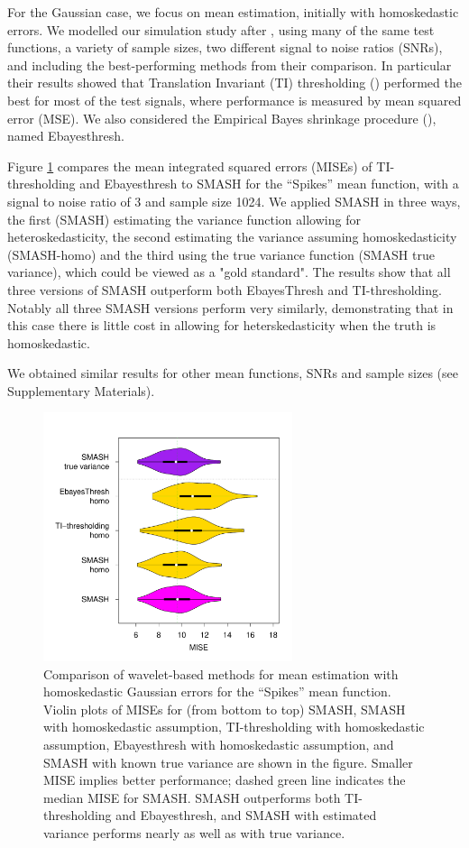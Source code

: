 \documentclass[12pt]{article}
\begin{document}
For the Gaussian case, we focus on mean estimation, initially with homoskedastic errors. We modelled our simulation study after
\cite{Antoniadis2001Wavelet}, using many of the same test functions, a variety of sample sizes, two different signal to noise ratios (SNRs), and including
the best-performing methods from their comparison. In particular their results showed that Translation Invariant (TI) thresholding (\cite{Coifman1995Translationinvariant}) performed the best for most of the test signals, where performance is measured by mean squared error (MSE). We also considered the Empirical Bayes shrinkage procedure (\cite{Johnstone2005Empirical}), named Ebayesthresh. 

Figure \ref{fig:gaus_homo} compares the mean integrated squared errors (MISEs) of TI-thresholding and Ebayesthresh to SMASH for the ``Spikes'' mean function, with a signal to noise ratio of 3 and sample size 1024. We applied SMASH in three ways, the first (SMASH) estimating the variance function allowing for heteroskedasticity, the second estimating the variance assuming homoskedasticity (SMASH-homo) and the
third using the true variance function (SMASH true variance), which could be viewed as a "gold standard". The results show that all three versions of SMASH outperform both EbayesThresh and TI-thresholding. Notably all three SMASH versions perform very similarly, demonstrating that
in this case there is little cost in allowing for heterskedasticity when the truth is homoskedastic.

We obtained similar results for other mean functions, SNRs and sample sizes (see Supplementary Materials).

\begin{figure}
\centering
    \includegraphics[width=0.65\textwidth]{violin_gaus_homo.pdf}
    \caption{Comparison of wavelet-based methods for mean estimation with homoskedastic Gaussian errors for the ``Spikes'' mean function. Violin plots of MISEs for (from bottom to top) SMASH, SMASH with homoskedastic assumption, TI-thresholding with homoskedastic assumption, Ebayesthresh with homoskedastic assumption, and SMASH with known true variance are shown in the figure. Smaller MISE implies better performance; dashed green line indicates the median MISE for SMASH. SMASH outperforms both TI-thresholding and Ebayesthresh, and SMASH with estimated variance performs nearly as well as with true variance.}
    \label{fig:gaus_homo}
\end{figure}
\end{document}
